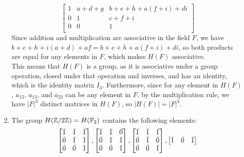 \documentclass[12pt]{article}
\begin{document}
\begin{enumerate}[label=\textbf{\alph*.}]
\[\begin{bmatrix}
                1 & a + d + g & b + e + h + a(f + i) + di \\
                0 & 1 & c + f + i \\
                0 & 0 & 1 \\
            \end{bmatrix} \]
            Since addition and multiplication are associative in the field
            $F$, 
            we have $ b + e + h + i(a + d) + af = b + e + h + a(f + i) + di$,
            so both products are equal for any elements in $F$,
            which makes $H(F)$ associative. \\
            This means that $H(F)$ is a group, as it is associative
            under a group operation,
            closed under that operation and inverses,
            and has an identity,
            which is the identity matrix $I_3$.
            Furthermore, since for any element in $H(F)$,
            $a_{12}$, $a_{13}$, and $a_{23}$ can be any element in $F$,
            by the multiplication rule,
            we have $|F|^3$ distinct matrices in $H(F)$,
            so $|H(F)| = |F|^3$.
        \item
            The group $H(\mathbb{Z}/2\mathbb{Z}) = H(\mathbb{F}_2)$ contains the following elements:
            \[ \begin{bmatrix}
                \olsi{1} & \olsi{1} & \olsi{1} \\
                \olsi{0} & \olsi{1} & \olsi{1} \\
                \olsi{0} & \olsi{0} & \olsi{1} \\
            \end{bmatrix},
            \begin{bmatrix}
                \olsi{1} & \olsi{1} & \olsi{0} \\
                \olsi{0} & \olsi{1} & \olsi{1} \\
                \olsi{0} & \olsi{0} & \olsi{1} \\
            \end{bmatrix},
            \begin{bmatrix}
                \olsi{1} & \olsi{1} & \olsi{1} \\
                \olsi{0} & \olsi{1} & \olsi{0} \\
                \olsi{0} & \olsi{0} & \olsi{1} \\
            \end{bmatrix},
            \begin{bmatrix}
                \olsi{1} & \olsi{0} & \olsi{1} \\

\end{bmatrix}\]
\end{enumerate}
\end{document}
